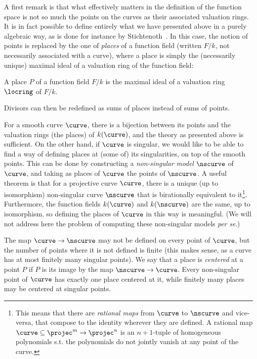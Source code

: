 A first remark is that what effectively matters in the definition of the function space is not so much the points on the curves as their associated valuation
rings. It is in fact possible to define entirely what we have presented above in a purely algebraic way, as is done for instance by Stichtenoth~\cite{stichtenoth}.
In this case, the notion of points is replaced by the one of \emph{places} of a function field (written $F/k$, not necessarily associated with a curve), where a place is simply the (necessarily unique) maximal
ideal of a valuation ring of the function field:

\begin{defi}
A place $P$ of a function field $F/k$ is the maximal ideal of a valuation ring $\locring$ of $F/k$. 
\end{defi}

Divisors can then be redefined as sums of places instead of sums of points.

For a smooth curve $\curve$, there is a bijection between its points and the valuation rings (the places) of $k(\curve)$, and the theory as presented above is sufficient.
On the other hand, if $\curve$ is singular, we would like to be able to find a way of defining places at (some of) its singularities, on top of the smooth points.
This can be done by constructing a \emph{non-singular model} $\nscurve$ of $\curve$,
and taking as places of $\curve$ the points of $\nscurve$. A useful theorem is that for a projective curve $\curve$, there is a unique (up to isomorphism) non-singular curve
$\nscurve$ that is birationally equivalent to it\footnote{This means that there are \emph{rational maps} from $\curve$ to $\nscurve$ and vice-versa, that compose to the identity wherever they are
defined.
A rational map $\curve \subseteq \projec^m \rightarrow \projec^n$ is an $n+1$-tuple of homogeneous polynomials s.t. the polynomials do not jointly
vanish at any point of the curve.}. Furthermore, the function fields $k(\curve)$ and $k(\nscurve)$ are the same, up to isomorphism, so defining the places of $\curve$ in this
way is meaningful.
(We will not address here the problem of computing these non-singular models \emph{per se}.)

The map $\curve \rightarrow \nscurve$ may not be defined on every point of $\curve$, but the number of points where it is not defined is finite (this makes sense, as a curve
has at most finitely many singular points). We say that a place is \emph{centered} at a point $P$ if $P$ is its image by the map $\nscurve \rightarrow \curve$.
Every non-singular
point of $\curve$ has exactly one place centered at it, while finitely many places may be centered at singular points.

